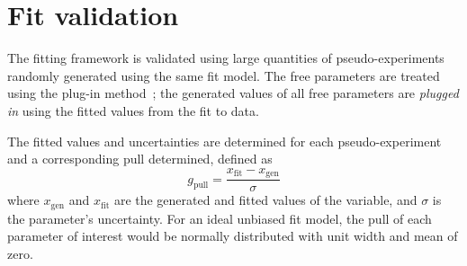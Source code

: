 


\section{Fit validation}
\label{sec:B2DsKK_fitvalidation}

The fitting framework is validated using large quantities of pseudo-experiments randomly generated using the same fit model. The free parameters are treated using the plug-in method~\cite{plugin}; the generated values of all free parameters are \emph{plugged in} using the fitted values from the fit to data.      

The fitted values and uncertainties are determined for each pseudo-experiment and a corresponding pull determined, defined as
\begin{equation}
g_{\text{pull}} = \frac{x_{\text{fit}} - x_{\text{gen}} }{\sigma}
\end{equation}
where $x_{\text{gen}}$ and $x_{\text{fit}}$ are the generated and fitted values of the variable, and $\sigma$ is the parameter's uncertainty.
For an ideal unbiased fit model, the pull of each parameter of interest would be normally distributed with unit width and mean of zero.  


